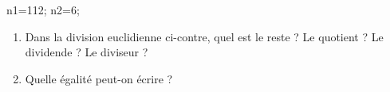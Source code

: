\documentclass[exercice]{thedocument}%
\begin{document}
%
    \!n1=112;%
    \!n2=6;%
    \begin{center}
        \end{center}
        \vspace{.5cm}
    \begin{enumerate}
        \item Dans la division euclidienne ci-contre, quel est le reste ? Le quotient ?
        Le dividende ? Le diviseur ?
        \item Quelle égalité peut-on écrire ?
    \end{enumerate}
\end{document}
